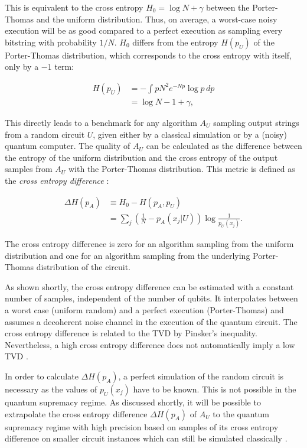This is equivalent to the cross entropy $H_0 = \log{N} + \gamma$ between the
Porter-Thomas and the uniform distribution. Thus, on
average, a worst-case noisy execution will be as good compared to a perfect execution as sampling
every bitstring with probability $1/N$. $H_0$ differs from the entropy $H(p_U)$ of
the Porter-Thomas distribution, which corresponds to the cross entropy with
itself, only by a $-1$ term:

\begin{align}
  H(p_U) &= - \int p N^2e^{-Np}\log{p} \, dp \\
         &= \log{N} -1 + \gamma,
\end{align}

This directly leads to a benchmark for any algorithm $A_U$ sampling output strings from a
random circuit $U$, given either by a
classical simulation or by a (noisy) quantum computer. The quality of 
$A_U$ can be calculated as the difference between
the entropy of the uniform distribution and the cross entropy of the output
samples from $A_U$ with the Porter-Thomas distribution. This metric is
defined as the \textit{cross entropy difference} \cite{Boixo2018supremacy}:

\begin{align}
  \Delta H(p_A) &\equiv H_0 - H(p_A, p_U) \\
                 &=\sum_j \left(\frac{1}{N} - p_A(x_j|U)\right)\log{\frac{1}{p_U(x_j)}}.
\end{align}

The cross entropy difference is zero for an algorithm sampling from the uniform
distribution and one for an algorithm sampling from the underlying Porter-Thomas
distribution of the circuit.

As shown shortly, the cross entropy difference can be estimated with a constant 
number of samples, independent of the number of qubits. It interpolates between 
a worst case (uniform random) and a perfect execution (Porter-Thomas) and assumes 
a decoherent noise channel in the execution of the quantum circuit. 
The cross entropy difference is related to the TVD by Pinsker's inequality. Nevertheless, 
a high cross entropy difference does not automatically imply a low TVD \cite{bouland2018quantum}.

In order to calculate $\Delta H(p_A)$, 
a perfect simulation of the random circuit is necessary as the values of $p_U(x_j)$ have to be known. This is not possible in the quantum
supremacy regime. As discussed shortly, it will be possible
to extrapolate the cross entropy difference $\Delta H(p_A)$ of $A_U$ to the quantum supremacy regime with high
precision based on samples of its cross entropy difference on smaller circuit
instances which can still be simulated classically \cite{Boixo2018supremacy}.

